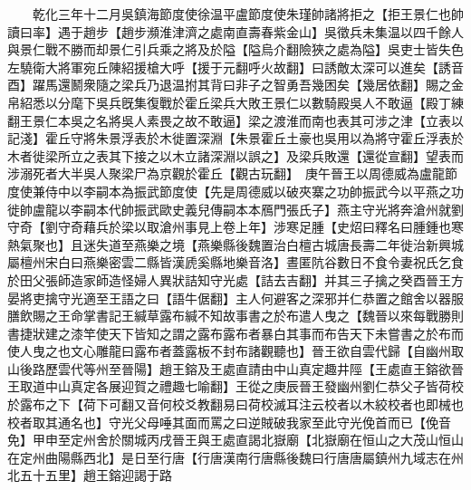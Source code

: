 　　乾化三年十二月吳鎮海節度使徐温平盧節度使朱瑾帥諸將拒之【拒王景仁也帥讀曰率】遇于趙步【趙步瀕淮津濟之處南直壽春紫金山】吳徵兵未集温以四千餘人與景仁戰不勝而却景仁引兵乘之將及於隘【隘烏介翻險狹之處為隘】吳吏士皆失色左驍衛大將軍宛丘陳紹援槍大呼【援于元翻呼火故翻】曰誘敵太深可以進矣【誘音酉】躍馬還鬭衆隨之梁兵乃退温拊其背曰非子之智勇吾幾困矣【幾居依翻】賜之金帛紹悉以分麾下吳兵旣集復戰於霍丘梁兵大敗王景仁以數騎殿吳人不敢逼【殿丁練翻王景仁本吳之名將吳人素畏之故不敢逼】梁之渡淮而南也表其可涉之津【立表以記淺】霍丘守將朱景浮表於木徙置深淵【朱景霍丘土豪也吳用以為將守霍丘浮表於木者徙梁所立之表其下接之以木立諸深淵以誤之】及梁兵敗還【還從宣翻】望表而涉溺死者大半吳人聚梁尸為京觀於霍丘【觀古玩翻】　庚午晉王以周德威為盧龍節度使兼侍中以李嗣本為振武節度使【先是周德威以破夾寨之功帥振武今以平燕之功徙帥盧龍以李嗣本代帥振武歐史義兒傳嗣本本鴈門張氏子】燕主守光將奔滄州就劉守奇【劉守奇藉兵於梁以取滄州事見上卷上年】涉寒足腫【史炤曰釋名曰腫鍾也寒熱氣聚也】且迷失道至燕樂之境【燕樂縣後魏置治白檀古城唐長壽二年徙治新興城屬檀州宋白曰燕樂密雲二縣皆漢虒奚縣地樂音洛】晝匿阬谷數日不食令妻祝氏乞食於田父張師造家師造怪婦人異狀詰知守光處【詰去吉翻】并其三子擒之癸酉晉王方晏將吏擒守光適至王語之曰【語牛倨翻】主人何避客之深邪并仁恭置之館舍以器服膳飲賜之王命掌書記王緘草露布緘不知故事書之於布遣人曳之【魏晉以來每戰勝則書捷狀建之漆竿使天下皆知之謂之露布露布者暴白其事而布告天下未嘗書之於布而使人曳之也文心雕龍曰露布者蓋露板不封布諸觀聽也】晉王欲自雲代歸【自幽州取山後路歷雲代等州至晉陽】趙王鎔及王處直請由中山真定趣井陘【王處直王鎔欲晉王取道中山真定各展迎賀之禮趣七喻翻】王從之庚辰晉王發幽州劉仁恭父子皆荷校於露布之下【荷下可翻又音何校爻教翻易曰荷校滅耳注云校者以木絞校者也即械也校者取其通名也】守光父母唾其面而罵之曰逆賊破我家至此守光俛首而已【俛音免】甲申至定州舍於關城丙戌晉王與王處直謁北嶽廟【北嶽廟在恒山之大茂山恒山在定州曲陽縣西北】是日至行唐【行唐漢南行唐縣後魏曰行唐唐屬鎮州九域志在州北五十五里】趙王鎔迎謁于路

